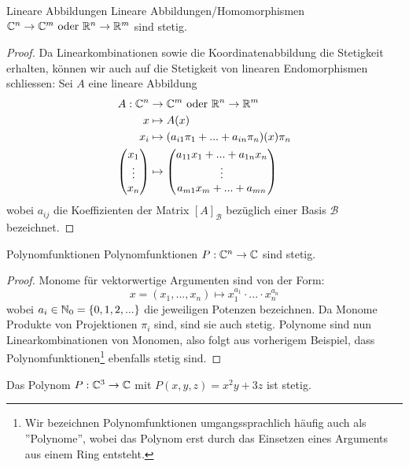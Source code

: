 \begin{lemma}{Lineare Abbildungen}{}
Lineare Abbildungen/Homomorphismen $\mathbb{C}^n \to \mathbb{C}^m \text{ oder } \mathbb{R}^n \to \mathbb{R}^m$ sind stetig.
\end{lemma}
\begin{proof} Da Linearkombinationen sowie die Koordinatenabbildung die Stetigkeit erhalten, können wir auch auf die Stetigkeit von linearen Endomorphismen schliessen: Sei $A$ eine lineare Abbildung
\begin{align*}
    A : \mathbb{C}^n &\to \mathbb{C}^m \text{ oder } \mathbb{R}^n \to \mathbb{R}^m\\
    x &\mapsto A(x)\\
    x_i &\mapsto  (a_{i1} \pi_1 + ... + a_{in} \pi_n)(x) \pi_n\\
    \begin{pmatrix} x_1\\\vdots\\x_n\end{pmatrix}&\mapsto\begin{pmatrix}a_{11} x_1 + ... + a_{1n} x_n\\\vdots\\a_{m1} x_m + ... + a_{mn}\end{pmatrix}
\end{align*}
wobei $a_{ij}$ die Koeffizienten der Matrix $[A]_\mathcal{B}$ bezüglich einer Basis $\mathcal{B}$ bezeichnet.
\end{proof}

\begin{lemma}{Polynomfunktionen}{}
Polynomfunktionen $P : \mathbb{C}^n \to \mathbb{C}$ sind stetig.
\end{lemma}
\begin{proof} Monome für vektorwertige Argumenten sind von der Form:
$$x = (x_1, ..., x_n) \mapsto x_1^{a_1}\cdot...\cdot x_n^{a_n}$$
wobei $a_i \in \mathbb{N}_0 = \{0,1,2,...\}$ die jeweiligen Potenzen bezeichnen. Da Monome Produkte von Projektionen $\pi_i$ sind, sind sie auch stetig. Polynome sind nun Linearkombinationen von Monomen, also folgt aus vorherigem Beispiel, dass Polynomfunktionen\footnote{Wir bezeichnen Polynomfunktionen umgangssprachlich häufig auch als ''Polynome'', wobei das Polynom erst durch das Einsetzen eines Arguments aus einem Ring entsteht.} ebenfalls stetig sind.
\end{proof}
\begin{example}Das Polynom $P: \mathbb{C}^3 \to \mathbb{C}$ mit $P(x,y,z) = x^2y + 3z$ ist stetig.\end{example}

